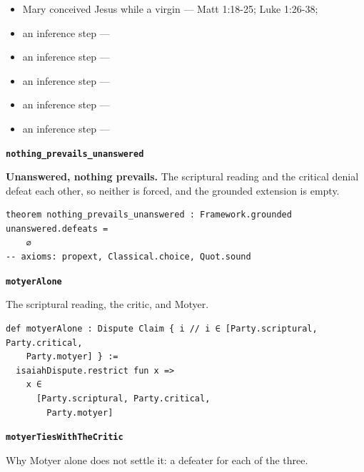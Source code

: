 \documentclass[11pt]{article}
\begin{document}
\begin{itemize}
\begin{itemize}
\item Mary conceived Jesus while a virgin --- Matt 1:18-25; Luke 1:26-38; \cite[30--33]{brown-problem-virginal-conception-1972}
\item an inference step --- \cite[ad loc. Isa 7:14]{motyer-isaiah-1993}
\item an inference step --- \cite{miravalle-meet-your-mother-2014}
\item an inference step --- \cite{miravalle-introduction-mary-2020}
\item an inference step --- \cite[490--493]{postell-isaiah-messianic-2025}
\item an inference step --- \cite[ad loc. Matt 1:23]{france-matthew-2007}
\end{itemize}
\end{itemize}
\par\medskip\noindent\textbf{\texttt{nothing\_\allowbreak{}prevails\_\allowbreak{}unanswered}}\par\nobreak\noindent
\textbf{Unanswered, nothing prevails.} The scriptural reading and the critical denial defeat each other, so neither is forced, and the grounded extension is empty.

{\small\begin{verbatim}
theorem nothing_prevails_unanswered : Framework.grounded unanswered.defeats =
    ∅
-- axioms: propext, Classical.choice, Quot.sound
\end{verbatim}}
\par\medskip\noindent\textbf{\texttt{motyer\allowbreak{}Alone}}\par\nobreak\noindent
The scriptural reading, the critic, and Motyer.

{\small\begin{verbatim}
def motyerAlone : Dispute Claim { i // i ∈ [Party.scriptural, Party.critical,
    Party.motyer] } :=
  isaiahDispute.restrict fun x =>
    x ∈
      [Party.scriptural, Party.critical,
        Party.motyer]
\end{verbatim}}
\par\medskip\noindent\textbf{\texttt{motyer\allowbreak{}Ties\allowbreak{}With\allowbreak{}The\allowbreak{}Critic}}\par\nobreak\noindent
Why Motyer alone does not settle it: a defeater for each of the three.
\end{document}
